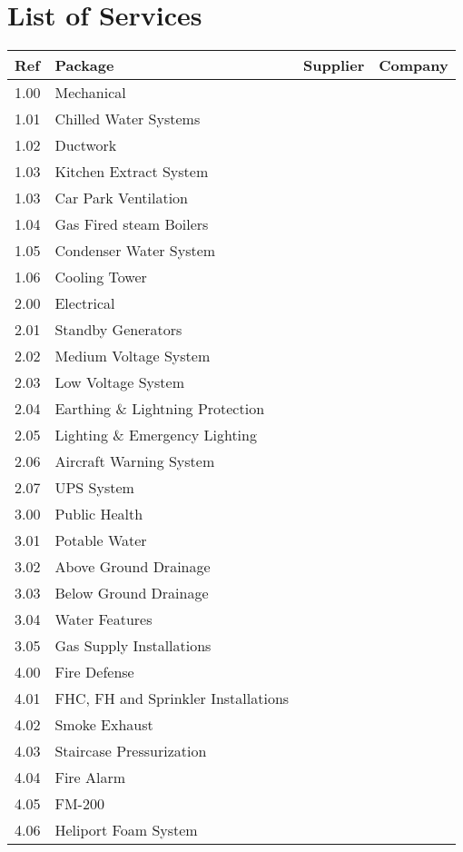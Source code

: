 \chapter{List of Services}
\label{chap:listofservices}

\begin{longtable}{llll}
\toprule
Ref	&Package	&Supplier	&Company\\
\midrule
1.00	&Mechanical	&	&\\
1.01	&Chilled Water Systems	&	&\\
1.02	&Ductwork  &		&\\
1.03    &Kitchen Extract System &&\\
1.03	&Car Park Ventilation 	&&\\
1.04	&Gas Fired steam Boilers &&		\\
1.05	&Condenser Water System 	&&     \\
1.06    &Cooling Tower &&  \\
\midrule
2.00	&Electrical		&&\\
2.01	&Standby Generators	&&\\	
2.02	&Medium Voltage System	&&\\	
2.03	&Low Voltage System		&&\\
2.04	&Earthing \& Lightning Protection &&\\		
2.05	&Lighting \& Emergency Lighting  &&\\		
2.06	&Aircraft Warning System &&\\		
2.07	&UPS System	&&\\	
\midrule
3.00	&Public Health		&&\\
3.01	&Potable Water	&&\\	
3.02	&Above Ground Drainage &&\\		
3.03	&Below Ground Drainage  &&\\		
3.04	&Water Features	     &&\\	
3.05	&Gas Supply Installations	&&\\	
\midrule		
4.00	&Fire Defense &&\\	
4.01	&FHC, FH and Sprinkler Installations	&&\\	
4.02	&Smoke Exhaust		&&\\
4.03	&Staircase Pressurization          &&\\		
4.04	&Fire Alarm		&&\\
4.05	&FM-200		&&\\
4.06	&Heliport Foam System	 &&\\	

\end{longtable}
